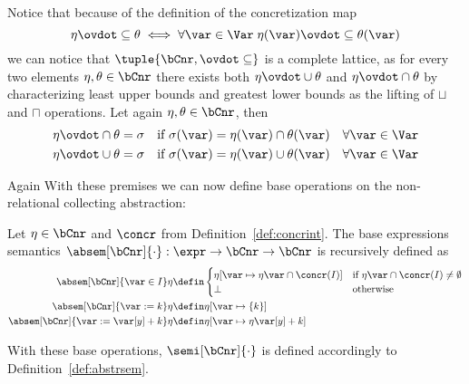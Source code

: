 Notice that because of the definition of the concretization map
\begin{equation*}
  \eta \ovdot\subseteq \theta \iff \forall \var \in \Var \; \eta(\var) \ovdot\subseteq \theta(\var)
\end{equation*}
we can notice that \(\tuple{\bCnr, \ovdot\subseteq}\) is a complete
lattice, as for every two elements \(\eta,\theta\in\bCnr\) there
exists both \(\eta \ovdot\cup \theta\) and \(\eta \ovdot\cap \theta\)
by characterizing least upper bounds and greatest lower bounds as the
lifting of \(\sqcup\) and \(\sqcap\) operations. Let again
\(\eta, \theta \in \bCnr\), then
\begin{align*}
  \eta \ovdot\cap \theta = \sigma & \quad \text{if } \sigma(\var) = \eta(\var) \cap \theta(\var) \quad \forall \var\in\Var \\
  \eta \ovdot\cup \theta = \sigma & \quad \text{if } \sigma(\var) = \eta(\var) \cup \theta(\var) \quad \forall \var\in\Var
\end{align*}

Again With these premises we can now define base
operations on the non-relational collecting abstraction:
\begin{definition}
  Let \(\eta \in \bCnr\) and \(\concr\) from
  Definition~\ref{def:concrint}. The base expressions semantics
  \(\absem[\bCnr]{\cdot} : \expr \to \bCnr \to \bCnr\) is recursively
  defined as
  \begin{align*}
    \absem[\bCnr]{\var\in I}\eta & \defin
                                   \begin{cases}
                                     \eta[\var\mapsto\eta\var\cap \concr(I)] & \text{if } \eta\var\cap \concr(I) \neq \emptyset \\
                                     \bot & \text{otherwise}
                                   \end{cases} \\
    \absem[\bCnr]{\var := k}\eta & \defin
                                     \eta[\var\mapsto\{k\}] %
    \\
    \absem[\bCnr]{\var := \var[y] + k}\eta & \defin
                                               \eta[\var\mapsto\eta\var[y] + k] %
  \end{align*}
\end{definition}
With these base operations, \(\semi[\bCnr]{\cdot}\) is defined
accordingly to Definition~\ref{def:abstrsem}.

